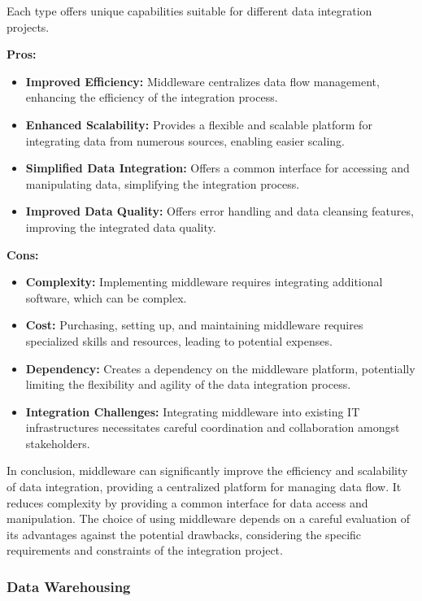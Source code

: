 \documentclass[12pt]{book}
\begin{document}
Each type offers unique capabilities suitable for different data integration projects.

\textbf{Pros:}

\begin{itemize}
    \item \textbf{Improved Efficiency:}  Middleware centralizes data flow management, enhancing the efficiency of the integration process.
    \item \textbf{Enhanced Scalability:}  Provides a flexible and scalable platform for integrating data from numerous sources, enabling easier scaling.
    \item \textbf{Simplified Data Integration:}  Offers a common interface for accessing and manipulating data, simplifying the integration process.
    \item \textbf{Improved Data Quality:}  Offers error handling and data cleansing features, improving the integrated data quality.
\end{itemize}

\textbf{Cons:}

\begin{itemize}
    \item \textbf{Complexity:}  Implementing middleware requires integrating additional software, which can be complex.
    \item \textbf{Cost:}  Purchasing, setting up, and maintaining middleware requires specialized skills and resources, leading to potential expenses.
    \item \textbf{Dependency:}  Creates a dependency on the middleware platform, potentially limiting the flexibility and agility of the data integration process.
    \item \textbf{Integration Challenges:} Integrating middleware into existing IT infrastructures necessitates careful coordination and collaboration amongst stakeholders.
\end{itemize}

In conclusion, middleware can significantly improve the efficiency and scalability of data integration, providing a centralized platform for managing data flow. It reduces complexity by providing a common interface for data access and manipulation. The choice of using middleware depends on a careful evaluation of its advantages against the potential drawbacks, considering the specific requirements and constraints of the integration project.

\subsubsection{Data Warehousing}
\end{document}
